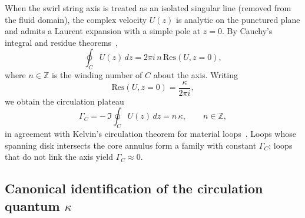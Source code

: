 \documentclass[11pt]{article}
\begin{document}
        When the swirl string axis is treated as an isolated singular line (removed from the fluid domain), the complex velocity \(U(z)\) is analytic on the punctured plane and admits a Laurent expansion with a simple pole at \(z=0\). By Cauchy’s integral and residue theorems~\cite{cauchy1825,ahlforsComplexAnalysis1979},
        \begin{equation}
            \oint_C U(z)\,dz
            =
            2\pi i\,n\,\mathrm{Res}\!\left(U,z=0\right),
        \end{equation}
        where \(n\in\mathbb{Z}\) is the winding number of \(C\) about the axis. Writing
        \begin{equation}
            \mathrm{Res}(U,z=0)
            =
            \frac{\kappa}{2\pi i},
        \end{equation}
        we obtain the circulation plateau
        \begin{equation}
            \Gamma_C
            =
            -\,\Im \oint_C U(z)\,dz
            =
            n\,\kappa,
            \qquad
            n\in\mathbb{Z},
            \label{eq:sst_circulation_quantized}
        \end{equation}
        in agreement with Kelvin’s circulation theorem for material loops~\cite{Helmholtz1858,Saffman1992,ChorinMarsden1993}. Loops whose spanning disk intersects the core annulus form a family with constant \(\Gamma_C\); loops that do not link the axis yield \(\Gamma_C\approx 0\).

    \subsection{Canonical identification of the circulation quantum \texorpdfstring{\(\kappa\)}{kappa}}
        \label{subsec:sst_kappa_canonical}
\end{document}
